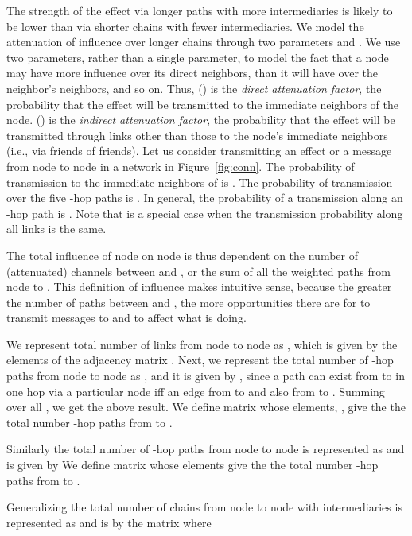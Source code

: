 \documentclass{sig-alternate}
\newcommand{\figref}[1]{Figure~\ref{#1}}
\begin{document}
The strength of the effect  via longer paths with more intermediaries is likely to be lower than via shorter chains with fewer intermediaries. We model the attenuation of influence over longer chains through two parameters    and . We use two parameters, rather than a single parameter, to model the fact that a node may have more influence over its direct neighbors, than it will have over the neighbor's neighbors, and so on. Thus,  () is the \emph{direct attenuation factor},  the probability that the effect will be transmitted to the immediate neighbors of the node.   () is the \emph{indirect attenuation factor}, the probability that the effect will be transmitted through links other than those to the node's immediate neighbors (i.e., via friends of friends). Let us consider transmitting an effect or a message from node   to node  in a network in \figref{fig:conn}. The probability of transmission to the immediate neighbors of  is . The probability of transmission over the five -hop paths is . In general, the probability of a transmission along an -hop path is . Note that  is a special case when the transmission probability along all links is the same.

The total influence of node  on node  is thus dependent on the number of (attenuated) channels between  and , or  the sum of all the  weighted paths from  node  to . This definition of influence makes intuitive sense, because the greater the number of paths between  and , the more opportunities there are for  to transmit messages to  and to affect what  is doing.


We represent total number of links from node  to node  as , which is given by the elements  of the adjacency matrix .
Next, we represent the total number of -hop paths from node  to node  as  , and it is given by , since a path can exist from  to   in one hop via a particular node  iff  an edge from   to  and also from  to . Summing over all , we get the above result. We define matrix  whose elements, , give the the total number -hop paths from  to .

Similarly  the total number of -hop paths from node  to node  is represented  as   and is given by 
We define matrix  whose elements
 give the the total number -hop paths from  to .

Generalizing  the total number of chains from node  to node  with  intermediaries    is represented  as  and  is  by the matrix  where
\end{document}
